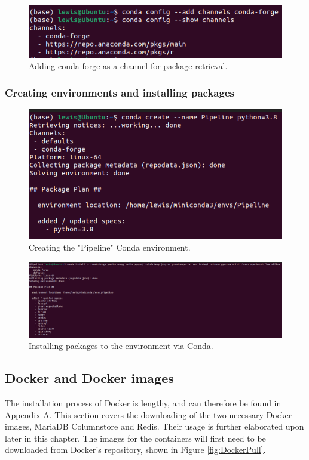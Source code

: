 \documentclass[12pt]{report}
\begin{document}
\begin{figure}[H]
    \centering
    \includegraphics[width=.75\linewidth]{Implementation/Conda/Installation/6.png}
    \caption{Adding conda-forge as a channel for package retrieval.}
    \label{fig:CondaInstall6}
\end{figure}

\subsubsection{Creating environments and installing packages}

\begin{figure}[H]
    \centering
    \includegraphics[width=.75\linewidth]{Implementation/Conda/CondaCreation.png}
    \caption{Creating the "Pipeline" Conda environment.}
    \label{fig:CondaCreation}
\end{figure}

\begin{figure}[H]
    \centering
    \includegraphics[width=\linewidth]{Implementation/Conda/CondaPackages.png}
    \caption{Installing packages to the environment via Conda.}
    \label{fig:CondaPackages}
\end{figure}


\pagebreak

\subsection{Docker and Docker images}
The installation process of Docker is lengthy, and can therefore be found in Appendix A. %
This section covers the downloading of the two necessary Docker images, MariaDB Columnstore and Redis. 
Their usage is further elaborated upon later in this chapter. The images for the containers will first need to be
downloaded from Docker's repository, shown in Figure \ref{fig:DockerPull}.
\end{document}
